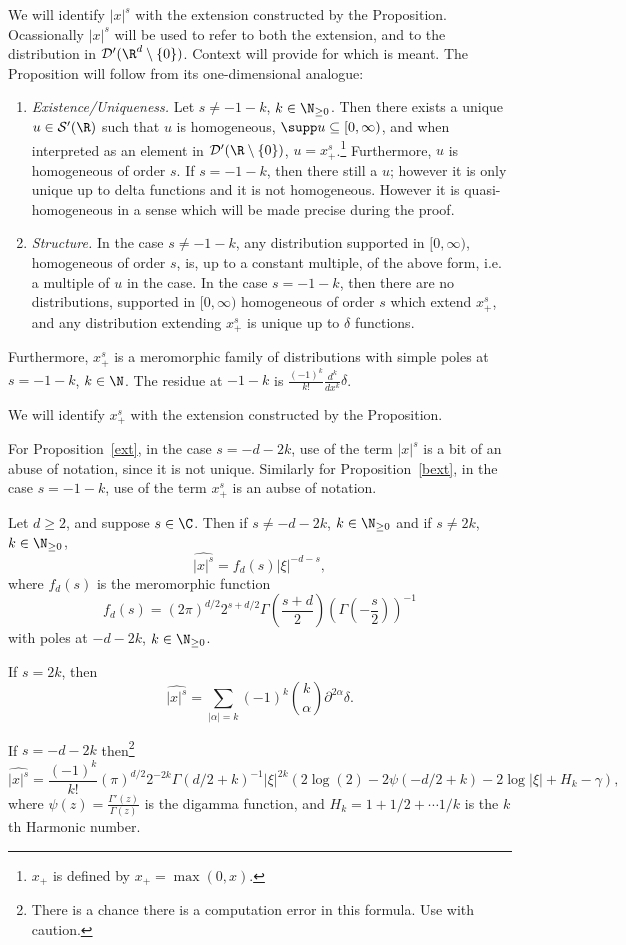 \documentclass[12pt]{article}
\begin{document}
We will identify $|x|^s$ with the extension constructed by the Proposition. Ocassionally $|x|^s$ will be used to refer to both the extension, and to the distribution in $\mathcal D'(\R^d\setminus\{0\})$. Context will provide for which is meant.
The Proposition will follow from its one-dimensional analogue:
\begin{prop}\label{bext}
\begin{enumerate}[label =(\roman*)]
Let $s \in \C$.
\item \emph{Existence/Uniqueness.} Let $s \neq -1-k$, $k \in \N_{\geq 0}$. Then there exists a unique $u \in \mathcal S'(\R)$ such that $u$ is homogeneous, $\supp u \subseteq [0,\infty)$, and when interpreted as an element in $\mathcal D'(\R\setminus\{0\})$, $u = x_+^s$.\footnote{$x_+$ is defined by $x_+ = \max(0,x)$.} Furthermore, $u$ is homogeneous of order $s$. If $s = -1-k$, then there still a $u$; however it is only unique up to delta functions and it is not homogeneous. However it is quasi-homogeneous in a sense which will be made precise during the proof. 
\item \emph{Structure.} In the case $s \neq -1-k$, any distribution supported in $[0,\infty)$, homogeneous of order $s$, is, up to a constant multiple, of the above form, i.e. a multiple of $u$ in the case. In the case $s = -1-k$, then there are no distributions, supported in $[0,\infty)$ homogeneous of order $s$ which extend $x_+^s$, and any distribution extending $x_+^{s}$ is unique up to $\delta$ functions.\end{enumerate}
Furthermore, $x_+^s$ is a meromorphic family of distributions with simple poles at $s = -1-k$, $k \in \N$. The residue at $-1-k$ is $\frac{(-1)^{k}}{k!}\frac{d^k}{dx^k}\delta$. \end{prop}
We will identify $x_+^s$ with the extension constructed by the Proposition.
\begin{rk}For Proposition~\ref{ext}, in the case $s = -d-2k$, use of the term $|x|^s$ is a bit of an abuse of notation, since it is not unique. Similarly for Proposition~\ref{bext}, in the case $s=-1-k$, use of the term $x_+^s$ is an aubse of notation.\end{rk}
\begin{thm}\label{FT}Let $d \geq 2$, and suppose $s \in \C$. Then if $s \neq -d-2k$, $k \in \N_{\geq 0}$ and if $s \neq 2k$, $k \in \N_{\geq 0}$,
\[\widehat{|x|^s} = f_d(s)|\xi|^{-d-s},\]
where $f_d(s)$ is the meromorphic function
\[f_d(s) = (2\pi)^{d/2}2^{s+d/2}\Gamma\left(\frac{s+d}{2}\right)\left(\Gamma\left(-\frac{s}{2}\right)\right)^{-1}\]
with poles at $-d-2k$, $k \in \N_{\geq 0}$.

If $s = 2k$, then \[\widehat{|x|^s} = \sum_{|\alpha| = k} (-1)^{k}{k \choose \alpha}\partial^{2\alpha}\delta.\]

If $s = -d-2k$ then\footnote{There is a chance there is a computation error in this formula. Use with caution.}
\[\widehat{|x|^s} = \frac{(-1)^k}{k!}(\pi)^{d/2}2^{-2k}\Gamma(d/2+k)^{-1}|\xi|^{2k}\left(2\log(2)-2\psi(-d/2+k)-2\log|\xi| + H_k-\gamma\right),\]
where $\psi(z) = \frac{\Gamma'(z)}{\Gamma(z)}$ is the digamma function, and $H_k = 1 + 1/2+ \cdots 1/k$ is the $k$th Harmonic number.\end{thm}
\end{document}
